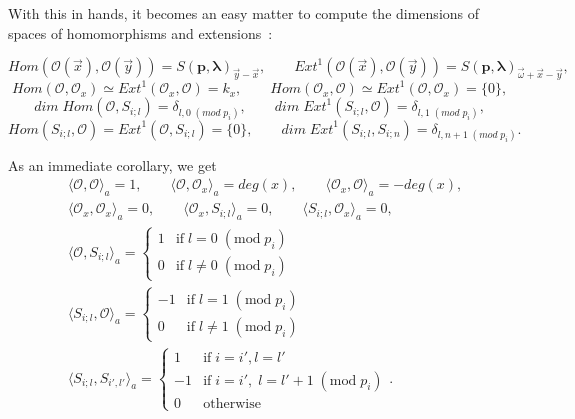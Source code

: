 \documentclass[a4paper,10pt]{amsart}
\def\O{\mathcal{O}}
\def\p{\mathbf{p}}
\def\llambda{\boldsymbol{\lambda}}
\numberwithin{equation}{section}
\begin{document}
{\vspace{.1in}

With this in hands, it becomes an easy matter to compute the dimensions of spaces of homomorphisms and extensions~:

\begin{equation*}
{Hom}(\O(\vec{x}),\O(\vec{y}))={S}(\p,\llambda)_{\vec{y}-\vec{x}}, \qquad {Ext}^1(\O(\vec{x}),\O(\vec{y}))={S}(\p,\llambda)_{\vec{\omega}+\vec{x}-\vec{y}},
\end{equation*}
\begin{equation*}
{Hom}(\O,\O_{x})\simeq {Ext}^1(\O_{x},\O)=k_x,\qquad {Hom}(\O_{x},\O)\simeq {Ext}^1(\O,\O_{x})=\{0\},
\end{equation*}
\begin{equation*}
{dim\;Hom}(\O,S_{i;l})=\delta_{l,0\;(mod\;p_i)}, \qquad
{dim\;Ext}^1(S_{i;l},\O)=\delta_{l,1\;(mod\;p_i)},
\end{equation*}
\begin{equation*}
{Hom}(S_{i;l},\O)={Ext}^1(\O,S_{i;l})=\{0\}, \qquad {dim}\;{Ext}^1(S_{i;l},
S_{i;n})=\delta_{l,n+1\;(mod\;p_i)}.
\end{equation*}

\vspace{.15in}

As an immediate corollary, we get
\begin{equation}\label{E:Eulerform}
\begin{split}
&\langle \O, \O \rangle_a =1, \qquad \langle \O, \O_{x} \rangle_a =deg(x),
\qquad \langle \O_x, \O \rangle_a =-deg(x),\\
&\langle \O_x,\O_x \rangle_a =0, \qquad \langle \O_x, S_{i;l}
\rangle_a =0, \qquad \langle S_{i;l},\O_x \rangle_a =0,\\
&\langle \O, S_{i;l} \rangle_a =\begin{cases} 1 & \mathrm{if}\; l=0\;(\text{mod}\;p_i)\\
0 & \mathrm{if}\; l \neq 0\;(\text{mod}\;p_i)\end{cases}\\
&\langle S_{i;l}, \O \rangle_a =\begin{cases} -1 & \mathrm{if}\; l=1\;(\text{mod}\;p_i)\\
0 & \mathrm{if}\; l \neq 1 \;(\text{mod}\;p_i)\end{cases}\\
&\langle S_{i;l}, S_{i',l'} \rangle_a =\begin{cases} 1 & \mathrm{if}
\; i=i', l=l'\\
-1 & \mathrm{if}\; i=i',\;l= l'+1\;(\mathrm{mod}\;p_i)\\
0 & \mathrm{otherwise} \end{cases}.
\end{split}
\end{equation}

}
\end{document}

